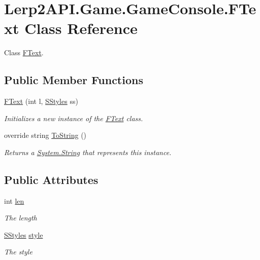 \hypertarget{class_lerp2_a_p_i_1_1_game_1_1_game_console_1_1_f_text}{}\section{Lerp2\+A\+P\+I.\+Game.\+Game\+Console.\+F\+Text Class Reference}
\label{class_lerp2_a_p_i_1_1_game_1_1_game_console_1_1_f_text}


Class \hyperlink{class_lerp2_a_p_i_1_1_game_1_1_game_console_1_1_f_text}{F\+Text}.  


\subsection*{Public Member Functions}
\begin{DoxyCompactItemize}
\item 
\hyperlink{class_lerp2_a_p_i_1_1_game_1_1_game_console_1_1_f_text_a38bb38a017db450615bc85934144549f}{F\+Text} (int l, \hyperlink{namespace_lerp2_a_p_i_1_1_game_a40a896b145d802bb883b777ab7413d7b}{S\+Styles} ss)
\begin{DoxyCompactList}\small\item\em Initializes a new instance of the \hyperlink{class_lerp2_a_p_i_1_1_game_1_1_game_console_1_1_f_text}{F\+Text} class. \end{DoxyCompactList}\item 
override string \hyperlink{class_lerp2_a_p_i_1_1_game_1_1_game_console_1_1_f_text_af20627132482eb8907b169f3ae96e522}{To\+String} ()
\begin{DoxyCompactList}\small\item\em Returns a \hyperlink{namespace_lerp2_a_p_i_1_1_game_a2f182da062f210cc43f341f6992ee293a27118326006d3829667a400ad23d5d98}{System.\+String} that represents this instance. \end{DoxyCompactList}\end{DoxyCompactItemize}
\subsection*{Public Attributes}
\begin{DoxyCompactItemize}
\item 
int \hyperlink{class_lerp2_a_p_i_1_1_game_1_1_game_console_1_1_f_text_ad79114144c9e6d45d1bd41f20b3c25b9}{len}
\begin{DoxyCompactList}\small\item\em The length \end{DoxyCompactList}\item 
\hyperlink{namespace_lerp2_a_p_i_1_1_game_a40a896b145d802bb883b777ab7413d7b}{S\+Styles} \hyperlink{class_lerp2_a_p_i_1_1_game_1_1_game_console_1_1_f_text_a3e1ec23d73b4cae7b21608d3175da2b6}{style}
\begin{DoxyCompactList}\small\item\em The style \end{DoxyCompactList}\end{DoxyCompactItemize}


